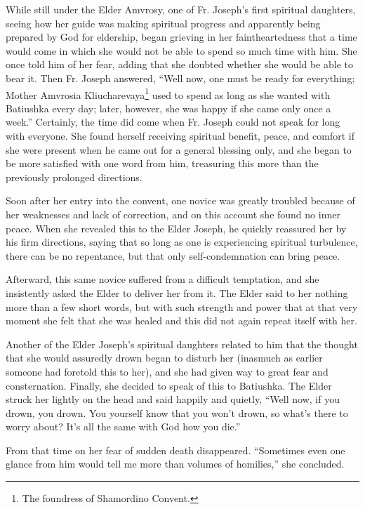 While still under the Elder Amvrosy, one of Fr. Joseph's first spiritual daughters, seeing how her guide was making spiritual progress and apparently being prepared by God for eldership, began grieving in her faintheartedness that a time would come in which she would not be able to spend so much time with him. She once told him of her fear, adding that she doubted whether she would be able to bear it. Then Fr. Joseph answered, “Well now, one must be ready for everything; Mother Amvrosia Kliucharevaya\footnote{The foundress of Shamordino Convent.} used to spend as long as she wanted with Batiushka every day; later, however, she was happy if she came only once a week.” Certainly, the time did come when Fr. Joseph could not speak for long with everyone. She found herself receiving spiritual benefit, peace, and comfort if she were present when he came out for a general blessing only, and she began to be more satisfied with one word from him, treasuring this more than the previously prolonged directions.

Soon after her entry into the convent, one novice was greatly troubled because of her weaknesses and lack of correction, and on this account she found no inner peace. When she revealed this to the Elder Joseph, he quickly reassured her by his firm directions, saying that so long as one is experiencing spiritual turbulence, there can be no repentance, but that only self-condemnation can bring peace.

Afterward, this same novice suffered from a difficult temptation, and she insistently asked the Elder to deliver her from it. The Elder said to her nothing more than a few short words, but with such strength and power that at that very moment she felt that she was healed and this did not again repeat itself with her.

Another of the Elder Joseph's spiritual daughters related to him that the thought that she would assuredly drown began to disturb her (inasmuch as earlier someone had foretold this to her), and she had given way to great fear and consternation. Finally, she decided to speak of this to Batiushka. The Elder struck her lightly on the head and said happily and quietly, “Well now, if you drown, you drown. You yourself know that you won't drown, so what's there to worry about? It's all the same with God how you die.”

From that time on her fear of sudden death disappeared. “Sometimes even one glance from him would tell me more than volumes of homilies,” she concluded.

